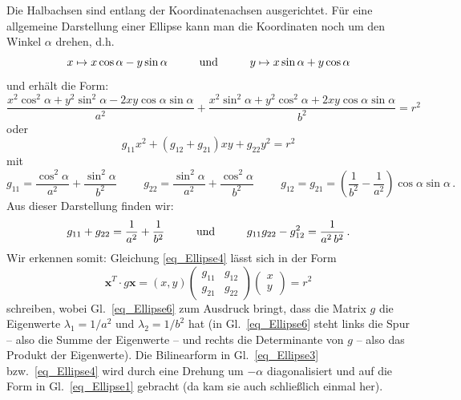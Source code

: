 Die Halbachsen sind entlang der Koordinatenachsen ausgerichtet.
F\"ur eine allgemeine Darstellung einer Ellipse kann man die Koordinaten noch um den Winkel $\alpha$
drehen, d.h.
\begin{equation}
\label{eq_Ellipse2}
        x \mapsto  x\cos \alpha  - y \sin \alpha   \hspace{1cm} {\rm und} \hspace{1cm}
        y \mapsto  x\sin \alpha + y \cos \alpha    
\end{equation}
und erh\"alt die Form:
\begin{equation}
\label{eq_Ellipse3}
             \frac{x^2 \cos^2 \alpha + y^2 \sin^2 \alpha - 2xy \cos \alpha \sin \alpha}{a^2} + 
             \frac{x^2 \sin^2 \alpha + y^2 \cos^2 \alpha + 2xy \cos \alpha \sin \alpha}{b^2} = r^2 
\end{equation}
oder
\begin{equation}
\label{eq_Ellipse4}
            g_{11} x^2 +  (g_{12}+g_{21})  xy + g_{22} y^2 = r^2 
\end{equation}
mit
\begin{equation}
\label{eq_Ellipse5}
            g_{11} = \frac{\cos^2 \alpha}{a^2} + \frac{\sin^2 \alpha}{b^2}   \hspace{1cm}
            g_{22} = \frac{\sin^2 \alpha}{a^2} + \frac{\cos^2 \alpha}{b^2}   \hspace{1cm}
            g_{12} = g_{21} = \left( \frac{1}{b^2} - \frac{1}{a^2}  \right) \cos \alpha \sin \alpha \, .
\end{equation}
Aus dieser Darstellung finden wir:
\begin{equation}
\label{eq_Ellipse6}
        g_{11}+g_{22} = \frac{1}{a^2} + \frac{1}{b^2} \hspace{1cm} {\rm und} \hspace{1cm}
        g_{11} g_{22} - g_{12}^2 = \frac{1}{a^2\,b^2}  \, .
\end{equation}
Wir erkennen somit: Gleichung \ref{eq_Ellipse4} l\"asst sich in der Form
\begin{equation}
                  \pmb{x}^T \cdot g \pmb{x} = ( x,y) 
                  \left( \begin{array}{cc} g_{11} & g_{12} \\ g_{21} & g_{22} \end{array} \right)
                  \left( \begin{array}{c} x \\ y \end{array} \right) =r^2
\end{equation}
schreiben, wobei Gl.\ \ref{eq_Ellipse6} zum Ausdruck bringt, dass die Matrix $g$ die
Eigenwerte $\lambda_1=1/a^2$ und $\lambda_2=1/b^2$ hat (in Gl.\ \ref{eq_Ellipse6} steht links
die Spur -- also die Summe der Eigenwerte -- und rechts die Determinante von $g$ -- also das
Produkt der Eigenwerte). Die Bilinearform in Gl.\ \ref{eq_Ellipse3} bzw.\ \ref{eq_Ellipse4} wird durch
eine Drehung um $-\alpha$ diagonalisiert und auf die Form in Gl.\ \ref{eq_Ellipse1} gebracht (da
kam sie auch schlie\ss lich einmal her). 

